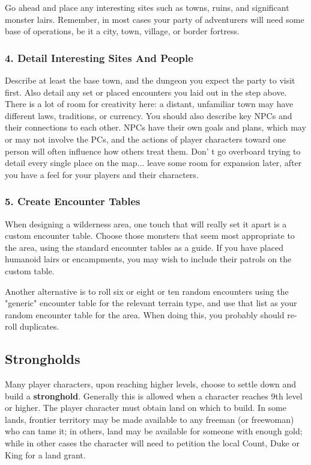 \documentclass[a4paper,twoside,openany,10pt]{book}
\begin{document}
\begin{multicols}{2}
Go ahead and place any interesting sites such as towns, ruins, and significant monster lairs. Remember, in most cases your party of adventurers will need some base of operations, be it a city, town, village, or border fortress.

\subsubsection{4. Detail Interesting Sites And People}\label{detail-interesting-sites-and-people}

Describe at least the base town, and the dungeon you expect the party to visit first. Also detail any set or placed encounters you laid out in the step above. There is a lot of room for creativity here: a distant, unfamiliar town may have different laws, traditions, or currency. You should also describe key NPCs and their connections to each other. NPCs have their own goals and plans, which may or may not involve the PCs, and the actions of player characters toward one person will often influence how others treat them. Don' t go overboard trying to detail every single place on the map... leave some room for expansion later, after you have a feel for your players and their characters.

\subsubsection{5. Create Encounter Tables}\label{create-encounter-tables}

When designing a wilderness area, one touch that will really set it apart is a custom encounter table. Choose those monsters that seem most appropriate to the area, using the standard encounter tables as a guide. If you have placed humanoid lairs or encampments, you may wish to include their patrols on the custom table.

Another alternative is to roll six or eight or ten random encounters using the "generic" encounter table for the relevant terrain type, and use that list as your random encounter table for the area. When doing this, you probably should re-roll duplicates.

\subsection{Strongholds}\label{strongholds}

Many player characters, upon reaching higher levels, choose to settle down and build a \textbf{stronghold}. Generally this is allowed when a character reaches 9th level or higher. The player character must obtain land on which to build. In some lands, frontier territory may be made available to any freeman (or freewoman) who can tame it; in others, land may be available for someone with enough gold; while in other cases the character will need to petition the local Count, Duke or King for a land grant.


\end{multicols}
\end{document}

